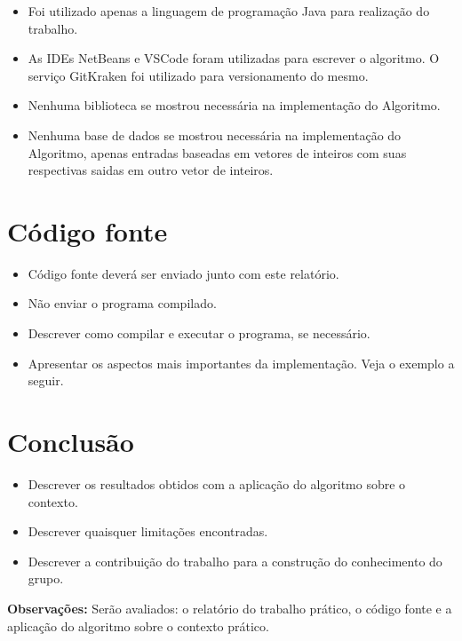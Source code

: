 \documentclass[12pt]{article}
\begin{document}
\begin{itemize}
    \item Foi utilizado apenas a linguagem de programação Java para realização do trabalho.
    \item As IDEs NetBeans e VSCode foram utilizadas para escrever o algoritmo. O serviço GitKraken foi utilizado para versionamento do mesmo. 
    \item Nenhuma biblioteca se mostrou necessária na implementação do Algoritmo.
    \item Nenhuma base de dados se mostrou necessária na implementação do Algoritmo, apenas entradas baseadas em vetores de inteiros com suas respectivas saidas em outro vetor de inteiros.
\end{itemize}

\section{Código fonte}

\begin{itemize}
    \item Código fonte deverá ser enviado junto com este relatório.
    \item Não enviar o programa compilado.
    \item Descrever como compilar e executar o programa, se necessário.
    \item Apresentar os aspectos mais importantes da implementação. Veja o exemplo a seguir.
\end{itemize}



\section{Conclusão}

\begin{itemize}
    \item Descrever os resultados obtidos com a aplicação do algoritmo sobre o contexto.
    \item Descrever quaisquer limitações encontradas.
    \item Descrever a contribuição do trabalho para a construção do conhecimento do grupo.
\end{itemize}

\noindent\textbf{Observações:} Serão avaliados: o relatório do trabalho prático, o código fonte e a aplicação do algoritmo sobre o contexto prático.
\end{document}
